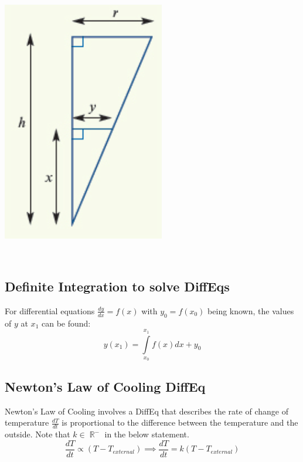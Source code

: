 \documentclass[a4paper,twoside,10pt]{article}
\DeclareMathOperator\R{\mathbb{R}}
\newenvironment{example}[1]{%
	\mbox{}\\\tcolorbox[beamer,breakable,%
		title=Example: #1,standard jigsaw,opacityback=0, colframe=blue!75!black, boxrule=2pt]}{\endtcolorbox\mbox{}\\}
\begin{document}
\begin{example}{Inverted Cone}
\begin{minipage}{0.2\textwidth}
					\includegraphics[width=\linewidth]{relatedratescone.png}
				\end{minipage}
				
			\end{example}
			
		\subsection{Definite Integration to solve DiffEqs}
			For differential equations $\frac{dy}{dx}=f(x)$ with $y_0=f(x_0)$ being known, the values of $y$ at $x_1$ can be found:
			\[
				y(x_1)=\int\limits_{x_0}^{x_1}f(x)dx+y_0
			\]
		
		\subsection{Newton's Law of Cooling DiffEq} Newton's Law of Cooling involves a DiffEq that describes the rate of change of temperature $\frac{dT}{dt}$ is proportional to the difference between the temperature and the outside. Note that $k\in\R^-$ in the below statement.
		\[
			\frac{dT}{dt}\propto (T-T_{external})\implies\frac{dT}{dt}=k(T-T_{external})
		\]
		
\end{document}
